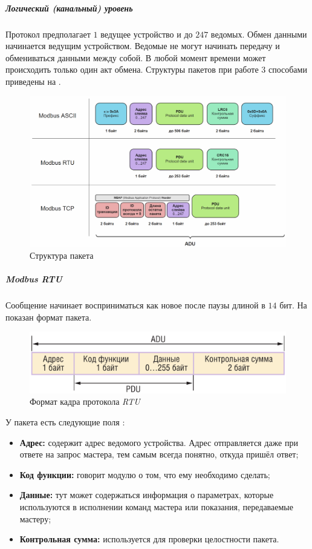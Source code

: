 \subparagraph{Логический (канальный) уровень}
Протокол \mb предполагает $1$ ведущее устройство и до $247$ ведомых. Обмен данными начинается ведущим устройством. Ведомые не могут начинать передачу и обмениваться данными между собой. В любой момент времени может происходить только один акт обмена. Структуры пакетов \mb при работе 3 способами приведены на .
\begin{figure}[p]
	\centering
	\includegraphics[width=0.9\linewidth]{images/modbus_struct}
	\caption{Структура пакета \mb}
	\label{fig:modbusstruct}
\end{figure}


\subparagraph{Modbus RTU} \label{par:modbusrtu}
Сообщение начинает восприниматься как новое после паузы длиной в $14$ бит. На  показан формат пакета.
\begin{figure}
	\centering
	\includegraphics[width=\linewidth]{images/modbus_PDU}
	\caption{Формат кадра протокола \mb \textit{RTU}}
	\label{fig:modbuspdu}
\end{figure}
У пакета есть следующие поля \cite{__2010}:
\begin{itemize}
	\item \textbf{Адрес:} содержит адрес ведомого устройства. Адрес отправляется даже при ответе на запрос мастера, тем самым всегда понятно, откуда пришёл ответ;
	\item \textbf{Код функции:} говорит модулю о том, что ему необходимо сделать;
	\item \textbf{Данные:} тут может содержаться информация о параметрах, которые используются в исполнении команд мастера или показания, передаваемые мастеру;
	\item \textbf{Контрольная сумма:} используется для проверки целостности пакета.
\end{itemize}

